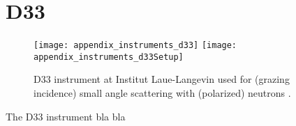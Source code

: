 \documentclass[\main/dresen_thesis.tex]{subfiles}
\begin{document}
  \section{D33}\label{ch:lss:d33}
    \begin{figure}[ht]
      \centering
      \texttt{[image: appendix\_instruments\_d33]}
      \texttt{[image: appendix\_instruments\_d33Setup]}
      \caption{\label{fig:lss:d33}D33 instrument at Institut Laue-Langevin used for (grazing incidence) small angle scattering with (polarized) neutrons \cite{Dewhurst_2015_Thesm}.}
    \end{figure}
    The D33 instrument bla bla
\end{document}
